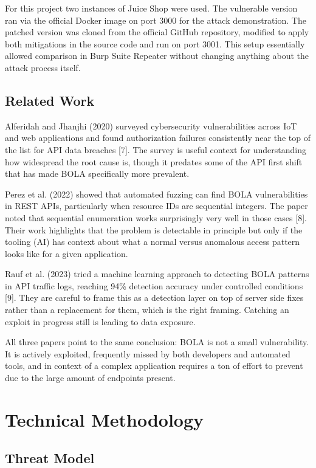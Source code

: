 \documentclass[12pt]{IEEEtran}
\begin{document}
For this project two instances of Juice Shop were used. The vulnerable version ran via the official Docker image on port 3000 for the attack demonstration. The patched version was cloned from the official GitHub repository, modified to apply both mitigations in the source code and run on port 3001. This setup essentially allowed comparison in Burp Suite Repeater without changing anything about the attack process itself.

\subsection{Related Work}

Alferidah and Jhanjhi (2020) surveyed cybersecurity vulnerabilities across IoT and web applications and found authorization failures consistently near the top of the list for API data breaches [7]. The survey is useful context for understanding how widespread the root cause is, though it predates some of the API first shift that has made BOLA specifically more prevalent.

Perez et al. (2022) showed that automated fuzzing can find BOLA vulnerabilities in REST APIs, particularly when resource IDs are sequential integers. The paper noted that sequential enumeration works surprisingly very well in those cases [8]. Their work highlights that the problem is detectable in principle but only if the tooling (AI) has context about what a normal versus anomalous access pattern looks like for a given application.

Rauf et al. (2023) tried a machine learning approach to detecting BOLA patterns in API traffic logs, reaching 94\% detection accuracy under controlled conditions [9]. They are careful to frame this as a detection layer on top of server side fixes rather than a replacement for them, which is the right framing. Catching an exploit in progress still is leading to data exposure.

All three papers point to the same conclusion: BOLA is not a small vulnerability. It is actively exploited, frequently missed by both developers and automated tools, and in context of a complex application requires a ton of  effort to prevent due to the large amount of endpoints present.

\section{Technical Methodology}

\subsection{Threat Model}
\end{document}
